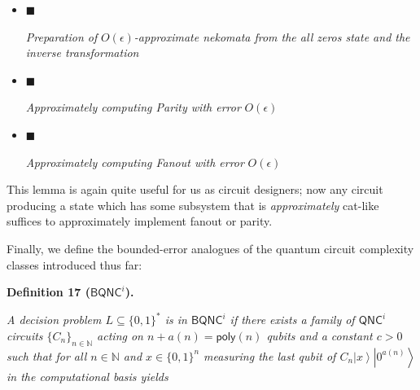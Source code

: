 \begin{itemize}


\item[] 
$\blacksquare$ 


\emph{Preparation of }$O(\epsilon)$\emph{-approximate nekomata from the all zeros state and the inverse transformation}\par





\item[] 
$\blacksquare$ 


\emph{Approximately computing Parity with error }$O(\epsilon)$\emph{}\par





\item[] 
$\blacksquare$ 


\emph{Approximately computing Fanout with error }$O(\epsilon)$\emph{}\par





\end{itemize}






This lemma is again quite useful for us as circuit designers; now any circuit producing a state which has some subsystem that is \emph{approximately} cat-like suffices to approximately implement fanout or parity.\par




Finally, we define the bounded-error analogues of the quantum circuit complexity classes introduced thus far:\par





\par\medskip\noindent\textbf{
\textbf{Definition 17}\textbf{ }(${\mathsf{BQNC}}^{i}$)\textbf{.}
}\par



\emph{A decision problem $L\subseteq\{0,1\}^{*}$ is in ${\mathsf{BQNC}}^{i}$ if there exists a family of ${\mathsf{QNC}}^{i}$ circuits $\{C_{n}\}_{n\in\mathbb{N}}$ acting on $n+a(n)={\mathsf{poly}}(n)$ qubits and a constant $c>0$ such that for all $n\in\mathbb{N}$ and $x\in\{0,1\}^{n}$ measuring the last qubit of $C_{n}\left|x\right\rangle\left|0^{a(n)}\right\rangle$ in the computational basis yields}\par


